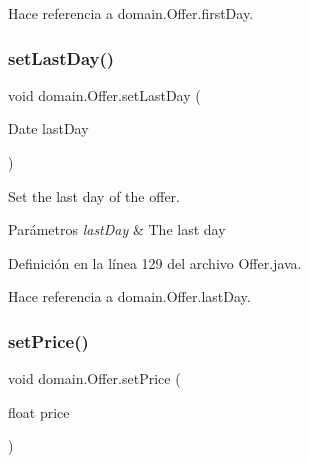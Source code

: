 Hace referencia a domain.\+Offer.\+first\+Day.

\mbox{\label{classdomain_1_1_offer_a52363278771059c51820160889c2bed1}} 
\subsubsection{\texorpdfstring{setLastDay()}{setLastDay()}}
{\footnotesize\ttfamily void domain.\+Offer.\+set\+Last\+Day (\begin{DoxyParamCaption}\item[{Date}]{last\+Day }\end{DoxyParamCaption})}



Set the last day of the offer. 


\begin{DoxyParams}{Parámetros}
{\em last\+Day} & The last day \\
\hline
\end{DoxyParams}


Definición en la línea 129 del archivo Offer.\+java.


\begin{DoxyCode}{0}

\end{DoxyCode}


Hace referencia a domain.\+Offer.\+last\+Day.

\mbox{\label{classdomain_1_1_offer_a8bd526902732e030571b6889c5507f4c}} 
\subsubsection{\texorpdfstring{setPrice()}{setPrice()}}
{\footnotesize\ttfamily void domain.\+Offer.\+set\+Price (\begin{DoxyParamCaption}\item[{float}]{price }\end{DoxyParamCaption})}



